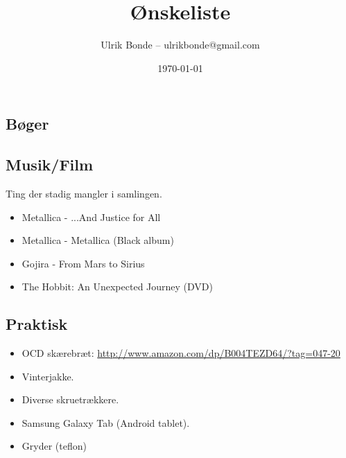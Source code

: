 \documentclass[a4paper, danish, 10pt, final]{article}
\title{Ønskeliste}
\author{Ulrik Bonde -- ulrikbonde@gmail.com}
\date{\today}
\begin{document}
\maketitle

\subsection*{Bøger}


\subsection*{Musik/Film}
Ting der stadig mangler i samlingen.
\begin{itemize}
    \item Metallica - ...And Justice for All
    \item Metallica - Metallica (Black album)
    \item Gojira - From Mars to Sirius
    \item The Hobbit: An Unexpected Journey (DVD)
\end{itemize}


\subsection*{Praktisk}
\begin{itemize}
    \item OCD skærebræt: \url{http://www.amazon.com/dp/B004TEZD64/?tag=047-20}
    \item Vinterjakke.
    \item Diverse skruetrækkere.
    \item Samsung Galaxy Tab (Android tablet).
    \item Gryder (teflon)
\end{itemize}




\end{document}
